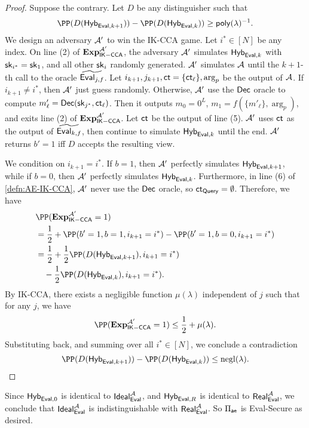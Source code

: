 \begin{proof}
    Suppose the contrary. Let $D$ be any distinguisher such that
    $$\PP(D(\Hyb_{\Eval, k + 1})) - \PP(D(\Hyb_{\Eval, k})) \geq \mathsf{poly}(\lambda)^{-1}.$$
    We design an adversary $\mathcal{A}'$ to win the IK-CCA game. Let $i^* \in [N]$ be any index. On line (2) of $\mathbf{Exp}_{\mathsf{IK-CCA}}^{\mathcal{A}'}$, the adversary $\mathcal{A}'$ simulates $\mathsf{Hyb}_{\mathsf{Eval}, k}$ with ${\mathsf{sk}}_{i^*} = {\mathsf{sk}}_1$, and all other ${\mathsf{sk}}_i$ randomly generated. $\mathcal{A}'$ simulates $\mathcal{A}$ until the $k + 1$-th call to the oracle $\widetilde{\mathsf{Eval}_{j, f}}$. Let $i_{k + 1}, j_{k + 1}, \mathsf{ct} = \{\mathsf{ct}_{\ell}\}, \arg_p$ be the output of $\mathcal{A}$. If $i_{k + 1} \neq i^*$, then $\mathcal{A}'$ just guess randomly. Otherwise, $\mathcal{A}'$ use the $\mathsf{Dec}$ oracle to compute $m'_\ell = \mathsf{Dec}({\mathsf{sk}}_{j^*}, \mathsf{ct}_\ell)$. Then it outputs $m_0 = 0^L$, $m_1 = f(\{m'_\ell\}, \arg_p)$, and exits line (2) of $\mathbf{Exp}_{\mathsf{IK-CCA}}^{\mathcal{A}'}$. Let $\mathsf{ct}$ be the output of line (5). $\mathcal{A}'$ uses $\mathsf{ct}$ as the output of $\widetilde{\mathsf{Eval}_{k, f}}$, then continue to simulate $\mathsf{Hyb}_{\mathsf{Eval}, k}$ until the end. $\mathcal{A}'$ returns $b' = 1$ iff $D$ accepts the resulting view.

    We condition on $i_{k + 1} = i^*$. If $b = 1$, then $\mathcal{A}'$ perfectly simulates $\mathsf{Hyb}_{\mathsf{Eval}, k + 1}$, while if $b = 0$, then $\mathcal{A}'$ perfectly simulates $\mathsf{Hyb}_{\mathsf{Eval}, k}$. Furthermore, in line (6) of \cref{defn:AE-IK-CCA}, $\mathcal{A}'$ never use the $\mathsf{Dec}$ oracle, so $\mathsf{ct}_{\mathsf{Query}} = \emptyset$. Therefore, we have
    \begin{align*}
     &\PP(\mathbf{Exp}_{\mathsf{IK-CCA}}^{\cA'} = 1) \\
     &= \frac{1}{2} + \PP(b' = 1, b = 1, i_{k + 1} = i^*) - \PP(b' = 1, b = 0, i_{k + 1} = i^*) \\   
     &= \frac{1}{2} + \frac{1}{2}\PP(D(\Hyb_{\Eval, k + 1}), i_{k + 1} = i^*)  \\
     & \quad - \frac{1}{2} \PP(D(\Hyb_{\Eval, k}), i_{k + 1} = i^*).
    \end{align*}
    By IK-CCA, there exists a negligible function $\mu(\lambda)$ independent of $j$ such that for any $j$, we have
    $$\PP(\mathbf{Exp}_\mathsf{IK-CCA}^{\cA'} = 1) \leq \frac{1}{2} + \mu(\lambda).$$
    Substituting back, and summing over all $i^* \in [N]$, we conclude a contradiction
    $$\PP(D(\Hyb_{\Eval, k + 1})) - \PP(D(\Hyb_{\Eval, k})) \leq \negl(\lambda).$$
\end{proof}
Since $\mathsf{Hyb}_{\mathsf{Eval}, 0}$ is identical to $\mathsf{Ideal}_{\mathsf{Eval}}^{\mathcal{A}}$, and $\mathsf{Hyb}_{\mathsf{Eval}, R}$ is identical to $\mathsf{Real}_{\mathsf{Eval}}^{\mathcal{A}}$, we conclude that $\mathsf{Ideal}_{\mathsf{Eval}}^{\mathcal{A}}$ is indistinguishable with $\mathsf{Real}_{\mathsf{Eval}}^{\mathcal{A}}$. So $\Pi_{\mathsf{ae}}$ is Eval-Secure as desired.

